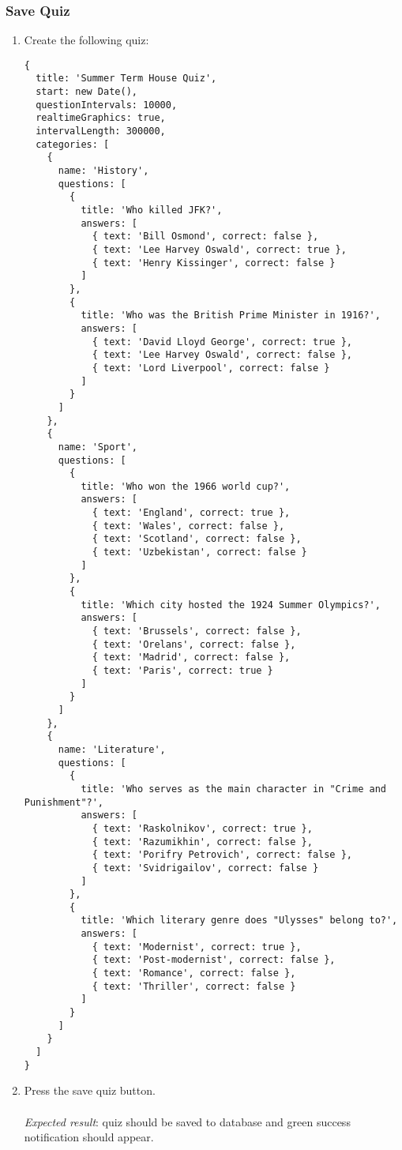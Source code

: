 \subsubsection{Save Quiz}
\begin{enumerate}[leftmargin=*]
\item Create the following quiz:
\begin{Verbatim}[fontsize=\small]
{
  title: 'Summer Term House Quiz',
  start: new Date(),
  questionIntervals: 10000,
  realtimeGraphics: true,
  intervalLength: 300000,
  categories: [
    {
      name: 'History',
      questions: [
        {
          title: 'Who killed JFK?',
          answers: [
            { text: 'Bill Osmond', correct: false },
            { text: 'Lee Harvey Oswald', correct: true },
            { text: 'Henry Kissinger', correct: false }
          ]
        },
        {
          title: 'Who was the British Prime Minister in 1916?',
          answers: [
            { text: 'David Lloyd George', correct: true },
            { text: 'Lee Harvey Oswald', correct: false },
            { text: 'Lord Liverpool', correct: false }
          ]
        }
      ]
    },
    {
      name: 'Sport',
      questions: [
        {
          title: 'Who won the 1966 world cup?',
          answers: [
            { text: 'England', correct: true },
            { text: 'Wales', correct: false },
            { text: 'Scotland', correct: false },
            { text: 'Uzbekistan', correct: false }
          ]
        },
        {
          title: 'Which city hosted the 1924 Summer Olympics?',
          answers: [
            { text: 'Brussels', correct: false },
            { text: 'Orelans', correct: false },
            { text: 'Madrid', correct: false },
            { text: 'Paris', correct: true }
          ]
        }
      ]
    },
    {
      name: 'Literature',
      questions: [
        {
          title: 'Who serves as the main character in "Crime and Punishment"?',
          answers: [
            { text: 'Raskolnikov', correct: true },
            { text: 'Razumikhin', correct: false },
            { text: 'Porifry Petrovich', correct: false },
            { text: 'Svidrigailov', correct: false }
          ]
        },
        {
          title: 'Which literary genre does "Ulysses" belong to?',
          answers: [
            { text: 'Modernist', correct: true },
            { text: 'Post-modernist', correct: false },
            { text: 'Romance', correct: false },
            { text: 'Thriller', correct: false }
          ]
        }
      ]
    }
  ]
}
\end{Verbatim}

\item Press the save quiz button.\\\\
\textit{Expected result}: quiz should be saved to database and green success notification should appear.
\end{enumerate}
